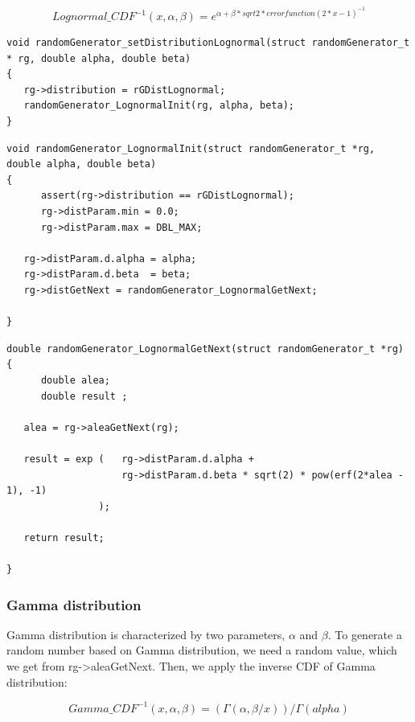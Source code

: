    $$ Lognormal\_CDF^{-1}(x,\alpha,\beta) = e^{\alpha + \beta * sqrt{2} * errorfunction(2*x-1)^{-1}} $$

\begin{verbatim}
void randomGenerator_setDistributionLognormal(struct randomGenerator_t * rg, double alpha, double beta)
{
   rg->distribution = rGDistLognormal;
   randomGenerator_LognormalInit(rg, alpha, beta);
} 
\end{verbatim}

\begin{verbatim}
void randomGenerator_LognormalInit(struct randomGenerator_t *rg, double alpha, double beta)
{
      assert(rg->distribution == rGDistLognormal);   
      rg->distParam.min = 0.0;
      rg->distParam.max = DBL_MAX;
  
   rg->distParam.d.alpha = alpha;
   rg->distParam.d.beta  = beta; 
   rg->distGetNext = randomGenerator_LognormalGetNext;

}
\end{verbatim}

\begin{verbatim}
double randomGenerator_LognormalGetNext(struct randomGenerator_t *rg)
{  
      double alea;
      double result ;
   
   alea = rg->aleaGetNext(rg);

   result = exp (   rg->distParam.d.alpha + 
                    rg->distParam.d.beta * sqrt(2) * pow(erf(2*alea - 1), -1) 
                );

   return result;

}  
\end{verbatim}

%
\subsubsection{Gamma distribution}
\label{gamma_dist}

Gamma distribution is characterized by two parameters, $\alpha$ and $\beta$.
To generate a random number based on Gamma distribution, we need a random value, which we get from rg->aleaGetNext. Then, we apply the inverse CDF of Gamma distribution:
  
  $$ Gamma\_CDF^{-1}(x, \alpha, \beta) = (\Gamma(\alpha, \beta/x))/\Gamma(alpha) $$

